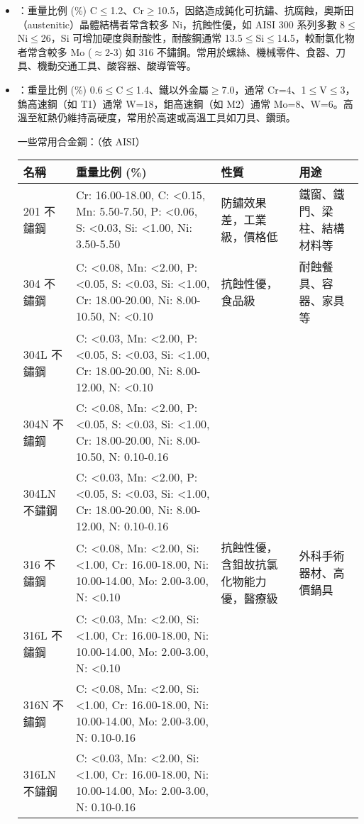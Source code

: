 \documentclass[a4paper,12pt]{report}
\begin{document}
\begin{itemize}
\begin{itemize}
\bit
\item {}：重量比例 (\%) C$\leq$1.2、Cr$\geq$10.5，因鉻造成鈍化可抗鏽、抗腐蝕，奧斯田（austenitic）晶體結構者常含較多 Ni，抗蝕性優，如 AISI 300 系列多數 8$\leq$Ni$\leq$26，Si 可增加硬度與耐酸性，耐酸鋼通常 13.5$\leq$Si$\leq$14.5，較耐氯化物者常含較多 Mo ($\approx$2-3) 如 316 不鏽鋼。常用於螺絲、機械零件、食器、刀具、機動交通工具、酸容器、酸導管等。
\item {}：重量比例 (\%) 0.6$\leq$C$\leq$1.4、鐵以外金屬$\geq$7.0，通常 Cr=4、1$\leq$V$\leq$3，鎢高速鋼（如 T1）通常 W=18，鉬高速鋼（如 M2）通常 Mo=8、W=6。高溫至紅熱仍維持高硬度，常用於高速或高溫工具如刀具、鑽頭。
\eit

一些常用合金鋼：（依 AISI）
\begin{longtable}[c]{|p{0.15\tw}|p{0.25\tw}|p{0.25\tw}|p{0.15\tw}|}
\hline
名稱 & 重量比例 (\%) & 性質 & 用途 \\\hline\endhead
201 不鏽鋼 & Cr: 16.00-18.00, C: <0.15, Mn: 5.50-7.50, P: <0.06, S: <0.03, Si: <1.00, Ni: 3.50-5.50 & 防鏽效果差，工業級，價格低 & 鐵窗、鐵門、梁柱、結構材料等 \\\hline
304 不鏽鋼 & C: <0.08, Mn: <2.00, P: <0.05, S: <0.03, Si: <1.00, Cr: 18.00-20.00, Ni: 8.00-10.50, N: <0.10 & 抗蝕性優，食品級 & 耐蝕餐具、容器、家具等 \\\cline{1-2}
304L 不鏽鋼 & C: <0.03, Mn: <2.00, P: <0.05, S: <0.03, Si: <1.00, Cr: 18.00-20.00, Ni: 8.00-12.00, N: <0.10 & & \\\cline{1-2}
304N 不鏽鋼 & C: <0.08, Mn: <2.00, P: <0.05, S: <0.03, Si: <1.00, Cr: 18.00-20.00, Ni: 8.00-10.50, N: 0.10-0.16 & & \\\cline{1-2}
304LN 不鏽鋼 & C: <0.03, Mn: <2.00, P: <0.05, S: <0.03, Si: <1.00, Cr: 18.00-20.00, Ni: 8.00-12.00, N: 0.10-0.16 & & \\\hline
316 不鏽鋼 & C: <0.08, Mn: <2.00, Si: <1.00, Cr: 16.00-18.00, Ni: 10.00-14.00, Mo: 2.00-3.00, N: <0.10 & 抗蝕性優，含鉬故抗氯化物能力優，醫療級 & 外科手術器材、高價鍋具 \\\cline{1-2}
316L 不鏽鋼 & C: <0.03, Mn: <2.00, Si: <1.00, Cr: 16.00-18.00, Ni: 10.00-14.00, Mo: 2.00-3.00, N: <0.10 & & \\\cline{1-2}
316N 不鏽鋼 & C: <0.08, Mn: <2.00, Si: <1.00, Cr: 16.00-18.00, Ni: 10.00-14.00, Mo: 2.00-3.00, N: 0.10-0.16 & & \\\cline{1-2}
316LN 不鏽鋼 & C: <0.03, Mn: <2.00, Si: <1.00, Cr: 16.00-18.00, Ni: 10.00-14.00, Mo: 2.00-3.00, N: 0.10-0.16 & & \\\hline

\end{longtable}
\end{itemize}
\end{itemize}
\end{document}

